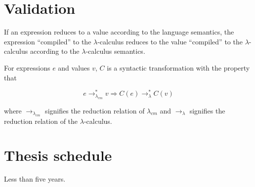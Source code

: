 \documentclass[ms]{byuprop}
\newtheorem*{cmtheorem}{C:\lambda_{CM}\rightarrow\lambda Meaning Preservation Extravaganza}
\begin{document}
\section{Validation}

If an expression reduces to a value according to the language semantics, the expression ``compiled'' to the $\lambda$-calculus reduces to the value ``compiled'' to the $\lambda$-calculus according to the $\lambda$-calculus semantics.


For expressions $e$ and values $v$, $C$ is a syntactic transformation with the property that

\[
e\rightarrow^{*}_{\lambda_{cm}}v\Rightarrow C(e)\rightarrow^{*}_{\lambda}C(v)
\]

where $\rightarrow_{\lambda_{cm}}$ signifies the reduction relation of $\lambda_{cm}$ and $\rightarrow_{\lambda}$ signifies the reduction relation of the $\lambda$-calculus.


\section{Thesis schedule}

Less than five years.





\end{document}
